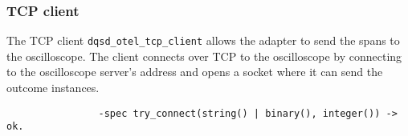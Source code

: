         \subsubsection{TCP client}
            The TCP client \texttt{dqsd\_otel\_tcp\_client} allows the adapter to send the spans to the oscilloscope.
            The client connects over TCP to the oscilloscope by connecting to the oscilloscope server's address and opens a socket where it can send the outcome instances.
            \begin{verbatim}
                -spec try_connect(string() | binary(), integer()) -> ok.
            \end{verbatim}
